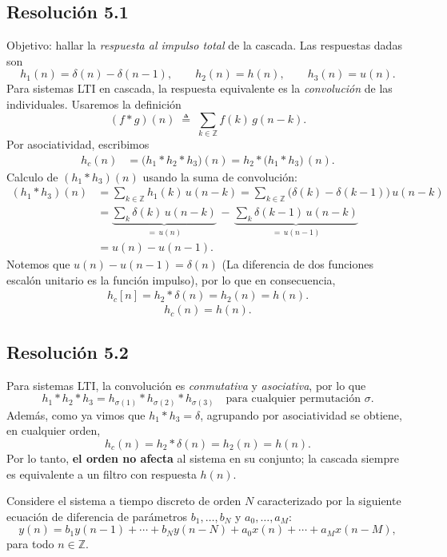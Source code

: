 \documentclass[
  11pt,
  letterpaper,
   addpoints,
  ]{exam}
\begin{document}
\begin{questions}
\begin{solution}
  \subsection*{Resolución 5.1}
  Objetivo: hallar la \emph{respuesta al impulso total} de la cascada. Las respuestas dadas son
  \[ h_1(n)=\delta(n)-\delta(n-1),\qquad h_2(n)=h(n),\qquad h_3(n)=u(n). \]
  Para sistemas LTI en cascada, la respuesta equivalente es la \emph{convolución} de las individuales. Usaremos la definición
  \[
    (f*g)(n)\;\triangleq\;\sum_{k\in\mathbb{Z}} f(k)\,g(n-k).
  \]
  Por asociatividad, escribimos
  \begin{align}
    h_c(n) 
    &= \big(h_1*h_2*h_3\big)(n)
     = h_2 * \big(h_1*h_3\big)\,(n).
  \end{align}
  	Calculo de $(h_1*h_3)(n)$ usando la suma de convolución:
  \begin{align}
    (h_1*h_3)(n)
      &= \sum_{k\in\mathbb{Z}} h_1(k)\,u(n-k)
       = \sum_{k\in\mathbb{Z}} \big(\delta(k)-\delta(k-1)\big)\,u(n-k)\\
      &= \underbrace{\sum_{k} \delta(k)\,u(n-k)}_{=\,u(n)}
       \, - \, \underbrace{\sum_{k} \delta(k-1)\,u(n-k)}_{=\,u(n-1)} \\
      &= u(n)-u(n-1).
  \end{align}
  Notemos que $u(n)-u(n-1)=\delta(n)$ (La diferencia de dos funciones escalón unitario es la función impulso), por lo que en consecuencia,
\begin{align}
  h_{c}[n] = h_2 * \delta(n) = h_2(n) = h(n).
\end{align}
  \[
    \boxed{\,h_c(n)=h(n).\,}
  \]


  \subsection*{Resolución 5.2}
Para sistemas LTI, la convolución es \emph{conmutativa} y \emph{asociativa}, por lo que
  \[
    h_1*h_2*h_3 = h_{\sigma(1)}*h_{\sigma(2)}*h_{\sigma(3)}\quad \text{para cualquier permutación }\sigma.
  \]
  Además, como ya vimos que $h_1*h_3=\delta$, agrupando por asociatividad se obtiene, en cualquier orden,
  \[
    h_c(n) = h_2*\delta(n) = h_2(n) = h(n).
  \]
  Por lo tanto, \textbf{el orden no afecta} al sistema en su conjunto; la cascada siempre es equivalente a un filtro con respuesta $h(n)$.
\end{solution}


\question Considere el sistema a tiempo discreto de orden $N$ caracterizado por la siguiente ecuación de diferencia de parámetros $b_1,\ldots,b_N$ y $a_0,\ldots,a_M$:
\begin{equation}
\label{eq:edo}
 y(n) = b_1 y(n-1)+\cdots+b_N y(n-N) + a_0 x(n)+\cdots+a_M x(n-M),
\end{equation}
para todo $n\in\mathbb{Z}$.


\end{questions}
\end{document}
